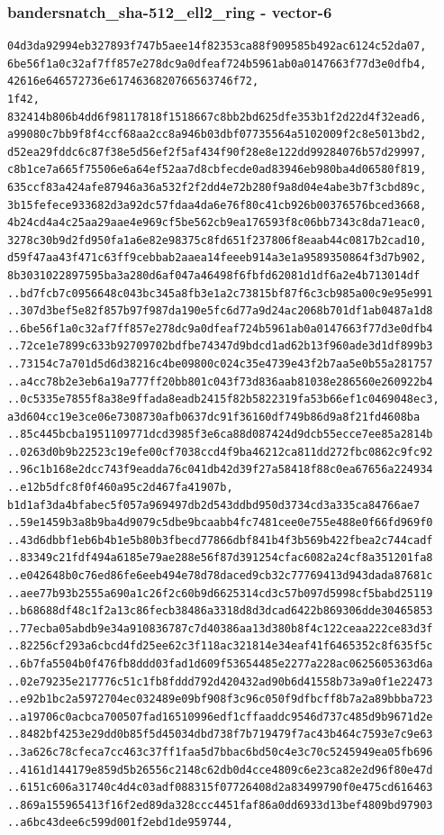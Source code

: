 \documentclass[
]{article}
\begin{document}
\subsubsection{bandersnatch\_sha-512\_ell2\_ring -
vector-6}\label{bandersnatch_sha-512_ell2_ring---vector-6}

\begin{verbatim}
04d3da92994eb327893f747b5aee14f82353ca88f909585b492ac6124c52da07,
6be56f1a0c32af7ff857e278dc9a0dfeaf724b5961ab0a0147663f77d3e0dfb4,
42616e646572736e6174636820766563746f72,
1f42,
832414b806b4dd6f98117818f1518667c8bb2bd625dfe353b1f2d22d4f32ead6,
a99080c7bb9f8f4ccf68aa2cc8a946b03dbf07735564a5102009f2c8e5013bd2,
d52ea29fddc6c87f38e5d56ef2f5af434f90f28e8e122dd99284076b57d29997,
c8b1ce7a665f75506e6a64ef52aa7d8cbfecde0ad83946eb980ba4d06580f819,
635ccf83a424afe87946a36a532f2f2dd4e72b280f9a8d04e4abe3b7f3cbd89c,
3b15fefece933682d3a92dc57fdaa4da6e76f80c41cb926b00376576bced3668,
4b24cd4a4c25aa29aae4e969cf5be562cb9ea176593f8c06bb7343c8da71eac0,
3278c30b9d2fd950fa1a6e82e98375c8fd651f237806f8eaab44c0817b2cad10,
d59f47aa43f471c63ff9cebbab2aaea14feeeb914a3e1a9589350864f3d7b902,
8b3031022897595ba3a280d6af047a46498f6fbfd62081d1df6a2e4b713014df
..bd7fcb7c0956648c043bc345a8fb3e1a2c73815bf87f6c3cb985a00c9e95e991
..307d3bef5e82f857b97f987da190e5fc6d77a9d24ac2068b701df1ab0487a1d8
..6be56f1a0c32af7ff857e278dc9a0dfeaf724b5961ab0a0147663f77d3e0dfb4
..72ce1e7899c633b92709702bdfbe74347d9bdcd1ad62b13f960ade3d1df899b3
..73154c7a701d5d6d38216c4be09800c024c35e4739e43f2b7aa5e0b55a281757
..a4cc78b2e3eb6a19a777ff20bb801c043f73d836aab81038e286560e260922b4
..0c5335e7855f8a38e9ffada8eadb2415f82b5822319fa53b66ef1c0469048ec3,
a3d604cc19e3ce06e7308730afb0637dc91f36160df749b86d9a8f21fd4608ba
..85c445bcba1951109771dcd3985f3e6ca88d087424d9dcb55ecce7ee85a2814b
..0263d0b9b22523c19efe00cf7038ccd4f9ba46212ca811dd272fbc0862c9fc92
..96c1b168e2dcc743f9eadda76c041db42d39f27a58418f88c0ea67656a224934
..e12b5dfc8f0f460a95c2d467fa41907b,
b1d1af3da4bfabec5f057a969497db2d543ddbd950d3734cd3a335ca84766ae7
..59e1459b3a8b9ba4d9079c5dbe9bcaabb4fc7481cee0e755e488e0f66fd969f0
..43d6dbbf1eb6b4b1e5b80b3fbecd77866dbf841b4f3b569b422fbea2c744cadf
..83349c21fdf494a6185e79ae288e56f87d391254cfac6082a24cf8a351201fa8
..e042648b0c76ed86fe6eeb494e78d78daced9cb32c77769413d943dada87681c
..aee77b93b2555a690a1c26f2c60b9d6625314cd3c57b097d5998cf5babd25119
..b68688df48c1f2a13c86fecb38486a3318d8d3dcad6422b869306dde30465853
..77ecba05abdb9e34a910836787c7d40386aa13d380b8f4c122ceaa222ce83d3f
..82256cf293a6cbcd4fd25ee62c3f118ac321814e34eaf41f6465352c8f635f5c
..6b7fa5504b0f476fb8ddd03fad1d609f53654485e2277a228ac0625605363d6a
..02e79235e217776c51c1fb8fddd792d420432ad90b6d41558b73a9a0f1e22473
..e92b1bc2a5972704ec032489e09bf908f3c96c050f9dfbcff8b7a2a89bbba723
..a19706c0acbca700507fad16510996edf1cffaaddc9546d737c485d9b9671d2e
..8482bf4253e29dd0b85f5d45034dbd738f7b719479f7ac43b464c7593e7c9e63
..3a626c78cfeca7cc463c37ff1faa5d7bbac6bd50c4e3c70c5245949ea05fb696
..4161d144179e859d5b26556c2148c62db0d4cce4809c6e23ca82e2d96f80e47d
..6151c606a31740c4d4c03adf088315f07726408d2a83499790f0e475cd616463
..869a155965413f16f2ed89da328ccc4451faf86a0dd6933d13bef4809bd97903
..a6bc43dee6c599d001f2ebd1de959744,
\end{verbatim}
\end{document}
